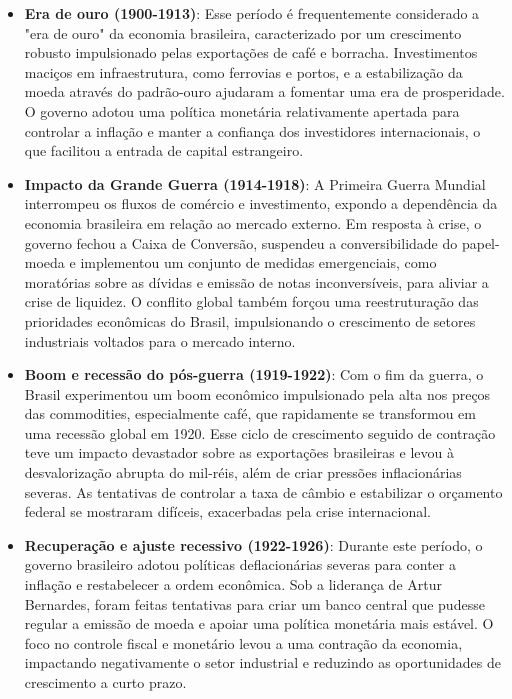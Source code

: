 \documentclass[a4paper,12pt]{article}[abntex2]
\begin{document}
\begin{itemize}
    \item \textbf{Era de ouro (1900-1913)}: Esse período é frequentemente considerado a "era de ouro" da economia brasileira, caracterizado por um crescimento robusto impulsionado pelas exportações de café e borracha. Investimentos maciços em infraestrutura, como ferrovias e portos, e a estabilização da moeda através do padrão-ouro ajudaram a fomentar uma era de prosperidade. O governo adotou uma política monetária relativamente apertada para controlar a inflação e manter a confiança dos investidores internacionais, o que facilitou a entrada de capital estrangeiro.
    
    \item \textbf{Impacto da Grande Guerra (1914-1918)}: A Primeira Guerra Mundial interrompeu os fluxos de comércio e investimento, expondo a dependência da economia brasileira em relação ao mercado externo. Em resposta à crise, o governo fechou a Caixa de Conversão, suspendeu a conversibilidade do papel-moeda e implementou um conjunto de medidas emergenciais, como moratórias sobre as dívidas e emissão de notas inconversíveis, para aliviar a crise de liquidez. O conflito global também forçou uma reestruturação das prioridades econômicas do Brasil, impulsionando o crescimento de setores industriais voltados para o mercado interno.
    
    \item \textbf{Boom e recessão do pós-guerra (1919-1922)}: Com o fim da guerra, o Brasil experimentou um boom econômico impulsionado pela alta nos preços das commodities, especialmente café, que rapidamente se transformou em uma recessão global em 1920. Esse ciclo de crescimento seguido de contração teve um impacto devastador sobre as exportações brasileiras e levou à desvalorização abrupta do mil-réis, além de criar pressões inflacionárias severas. As tentativas de controlar a taxa de câmbio e estabilizar o orçamento federal se mostraram difíceis, exacerbadas pela crise internacional.
    
    \item \textbf{Recuperação e ajuste recessivo (1922-1926)}: Durante este período, o governo brasileiro adotou políticas deflacionárias severas para conter a inflação e restabelecer a ordem econômica. Sob a liderança de Artur Bernardes, foram feitas tentativas para criar um banco central que pudesse regular a emissão de moeda e apoiar uma política monetária mais estável. O foco no controle fiscal e monetário levou a uma contração da economia, impactando negativamente o setor industrial e reduzindo as oportunidades de crescimento a curto prazo.
    

\end{itemize}
\end{document}
